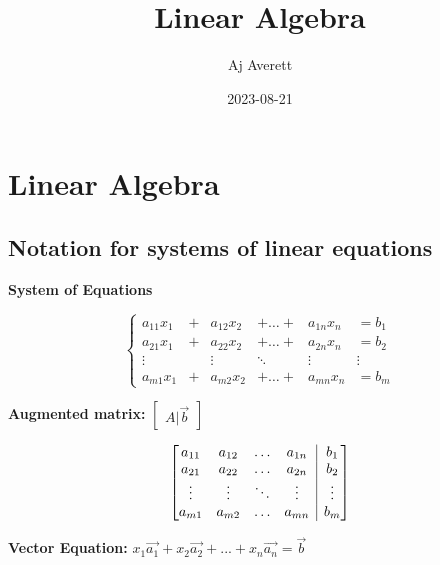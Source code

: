 \documentclass[
  letterpaper,
  DIV=11,
  numbers=noendperiod]{scrreprt}
\title{Linear Algebra}
\author{Aj Averett}
\date{2023-08-21}
\renewcommand*\contentsname{Table of contents}
\newcommand\contentsname{Table of contents}
\begin{document}
\maketitle
\renewcommand*\contentsname{Table of contents}
{
\hypersetup{linkcolor=}
\setcounter{tocdepth}{2}
\tableofcontents
}

\hypertarget{linear-algebra}{%
\chapter*{Linear Algebra}\label{linear-algebra}}


\hypertarget{notation-for-systems-of-linear-equations}{%
\section*{Notation for systems of linear
equations}\label{notation-for-systems-of-linear-equations}}


\textbf{System of Equations}

\[
\begin{cases}
a_{11}x_1 & + &a_{12}x_2 &+ \dots+ & a_{1n}x_n &= b_1 \\
a_{21}x_1 & + &a_{22}x_2 &+ \dots+ & a_{2n}x_n &= b_2 \\
\vdots && \vdots & \ddots & \vdots & \vdots \\
a_{m1}x_1 & + &a_{m2}x_2 &+ \dots+ & a_{mn}x_n &= b_m
\end{cases}
\]

\textbf{Augmented matrix:} \(\begin{bmatrix}A|\vec{b}\end{bmatrix}\)

\[
\left[\begin{array}{@{}cccc|c@{}}
a_{11} & a_{12} & \dots & a_{1n} & b_1 \\
a_{21} & a_{22} & \dots & a_{2n} & b_2 \\
\vdots & \vdots & \ddots & \vdots & \vdots \\
a_{m1} & a_{m2} & \dots & a_{mn} & b_m
\end{array}\right]
\]

\textbf{Vector Equation:}
\(x_1\vec{a_1}+x_2\vec{a_2}+...+x_n\vec{a_n}=\vec{b}\)
\end{document}
